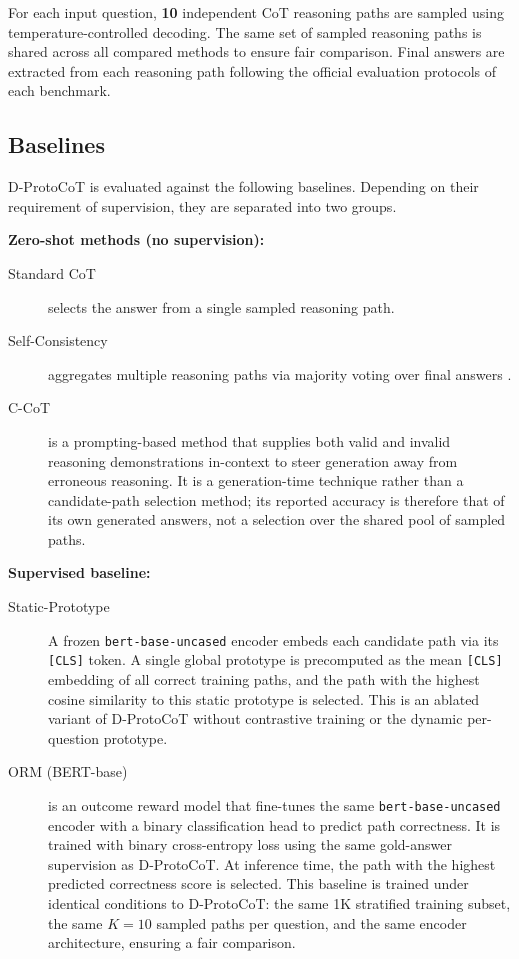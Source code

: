 \documentclass[a4paper,fleqn]{cas-dc}
\begin{document}
For each input question, \textbf{10} independent CoT reasoning paths are sampled using temperature-controlled decoding. The same set of sampled reasoning paths is shared across all compared methods to ensure fair comparison. Final answers are extracted from each reasoning path following the official evaluation protocols of each benchmark.

\subsection{Baselines}

D-ProtoCoT is evaluated against the following baselines. Depending on their requirement of supervision, they are separated into two groups.

\textbf{Zero-shot methods (no supervision):}
\begin{description}
    \item[Standard CoT] selects the answer from a single sampled reasoning path.
    \item[Self-Consistency] aggregates multiple reasoning paths via majority voting over final answers \citep{wang2023selfconsistencyimproveschainofthoughtreasoning}.
    \item[C-CoT] \citep{chia2023contrastivechainofthoughtprompting} is a prompting-based method that supplies both valid and invalid reasoning demonstrations in-context to steer generation away from erroneous reasoning. It is a generation-time technique rather than a candidate-path selection method; its reported accuracy is therefore that of its own generated answers, not a selection over the shared pool of sampled paths.
\end{description}

\textbf{Supervised baseline:}
\begin{description}
    \item[Static-Prototype] A frozen \texttt{bert-base-uncased} encoder embeds each candidate path via its \texttt{[CLS]} token. A single global prototype is precomputed as the mean \texttt{[CLS]} embedding of all correct training paths, and the path with the highest cosine similarity to this static prototype is selected. This is an ablated variant of D-ProtoCoT without contrastive training or the dynamic per-question prototype.
    \item[ORM (BERT-base)]\cite{cobbe2021trainingverifiers} is an outcome reward model that fine-tunes the same \texttt{bert-base-uncased} encoder with a binary classification head to predict path correctness. It is trained with binary cross-entropy loss using the same gold-answer supervision as D-ProtoCoT. At inference time, the path with the highest predicted correctness score is selected. This baseline is trained under identical conditions to D-ProtoCoT: the same 1K stratified training subset, the same $K{=}10$ sampled paths per question, and the same encoder architecture, ensuring a fair comparison.
\end{description}
\end{document}
